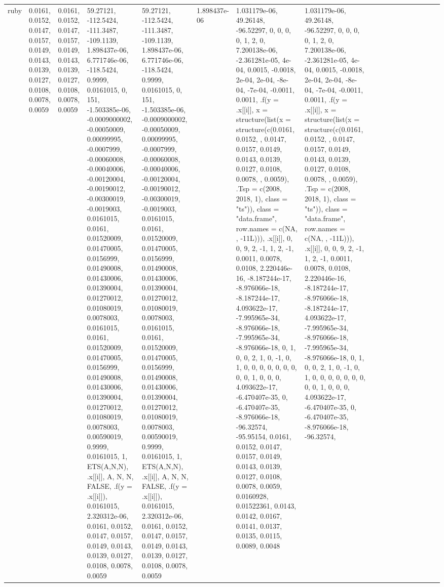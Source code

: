 \documentclass[
]{article}
\begin{document}
\begin{table}
\begin{tabular}{l|l|l|l|l|l|l|l|l|l|l|r|l|r|r|r|r|r}
ruby & 0.0161, 0.0152, 0.0147, 0.0157, 0.0149, 0.0143, 0.0139, 0.0127, 0.0108, 0.0078, 0.0059 & 0.0161, 0.0152, 0.0147, 0.0157, 0.0149, 0.0143, 0.0139, 0.0127, 0.0108, 0.0078, 0.0059 & 59.27121, -112.5424, -111.3487, -109.1139, 1.898437e-06, 6.771746e-06, -118.5424, 0.9999, 0.0161015, 0, 151, -1.503385e-06, -0.0009000002, -0.00050009, 0.00099995, -0.0007999, -0.00060008, -0.00040006, -0.00120004, -0.00190012, -0.00300019, -0.0019003, 0.0161015, 0.0161, 0.01520009, 0.01470005, 0.0156999, 0.01490008, 0.01430006, 0.01390004, 0.01270012, 0.01080019, 0.0078003, 0.0161015, 0.0161, 0.01520009, 0.01470005, 0.0156999, 0.01490008, 0.01430006, 0.01390004, 0.01270012, 0.01080019, 0.0078003, 0.00590019, 0.9999, 0.0161015, 1, ETS(A,N,N), .x[[i]], A, N, N, FALSE, .f(y = .x[[i]]), 0.0161015, 2.320312e-06, 0.0161, 0.0152, 0.0147, 0.0157, 0.0149, 0.0143, 0.0139, 0.0127, 0.0108, 0.0078, 0.0059 & 59.27121, -112.5424, -111.3487, -109.1139, 1.898437e-06, 6.771746e-06, -118.5424, 0.9999, 0.0161015, 0, 151, -1.503385e-06, -0.0009000002, -0.00050009, 0.00099995, -0.0007999, -0.00060008, -0.00040006, -0.00120004, -0.00190012, -0.00300019, -0.0019003, 0.0161015, 0.0161, 0.01520009, 0.01470005, 0.0156999, 0.01490008, 0.01430006, 0.01390004, 0.01270012, 0.01080019, 0.0078003, 0.0161015, 0.0161, 0.01520009, 0.01470005, 0.0156999, 0.01490008, 0.01430006, 0.01390004, 0.01270012, 0.01080019, 0.0078003, 0.00590019, 0.9999, 0.0161015, 1, ETS(A,N,N), .x[[i]], A, N, N, FALSE, .f(y = .x[[i]]), 0.0161015, 2.320312e-06, 0.0161, 0.0152, 0.0147, 0.0157, 0.0149, 0.0143, 0.0139, 0.0127, 0.0108, 0.0078, 0.0059 & 1.898437e-06 & 1.031179e-06, 49.26148, -96.52297, 0, 0, 0, 0, 1, 2, 0, 7.200138e-06, -2.361281e-05, 4e-04, 0.0015, -0.0018, 2e-04, 2e-04, -8e-04, -7e-04, -0.0011, 0.0011, .f(y = .x[[i]], x = structure(list(x = structure(c(0.0161, 0.0152, , 0.0147, 0.0157, 0.0149, 0.0143, 0.0139, 0.0127, 0.0108, 0.0078, , 0.0059), .Tsp = c(2008, 2018, 1), class = "ts")), class = "data.frame", row.names = c(NA, , -11L))), .x[[i]], 0, 0, 9, 2, -1, 1, 2, -1, 0.0011, 0.0078, 0.0108, 2.220446e-16, -8.187244e-17, -8.976066e-18, -8.187244e-17, 4.093622e-17, -7.995965e-34, -8.976066e-18, -7.995965e-34, -8.976066e-18, 0, 1, 0, 0, 2, 1, 0, -1, 0, 1, 0, 0, 0, 0, 0, 0, 0, 0, 0, 1, 0, 0, 0, 4.093622e-17, -6.470407e-35, 0, -6.470407e-35, -8.976066e-18, -96.32574, -95.95154, 0.0161, 0.0152, 0.0147, 0.0157, 0.0149, 0.0143, 0.0139, 0.0127, 0.0108, 0.0078, 0.0059, 0.0160928, 0.01522361, 0.0143, 0.0142, 0.0167, 0.0141, 0.0137, 0.0135, 0.0115, 0.0089, 0.0048 & 1.031179e-06, 49.26148, -96.52297, 0, 0, 0, 0, 1, 2, 0, 7.200138e-06, -2.361281e-05, 4e-04, 0.0015, -0.0018, 2e-04, 2e-04, -8e-04, -7e-04, -0.0011, 0.0011, .f(y = .x[[i]], x = structure(list(x = structure(c(0.0161, 0.0152, , 0.0147, 0.0157, 0.0149, 0.0143, 0.0139, 0.0127, 0.0108, 0.0078, , 0.0059), .Tsp = c(2008, 2018, 1), class = "ts")), class = "data.frame", row.names = c(NA, , -11L))), .x[[i]], 0, 0, 9, 2, -1, 1, 2, -1, 0.0011, 0.0078, 0.0108, 2.220446e-16, -8.187244e-17, -8.976066e-18, -8.187244e-17, 4.093622e-17, -7.995965e-34, -8.976066e-18, -7.995965e-34, -8.976066e-18, 0, 1, 0, 0, 2, 1, 0, -1, 0, 1, 0, 0, 0, 0, 0, 0, 0, 0, 0, 1, 0, 0, 0, 4.093622e-17, -6.470407e-35, 0, -6.470407e-35, -8.976066e-18, -96.32574, 
\end{tabular}
\end{table}
\end{document}
